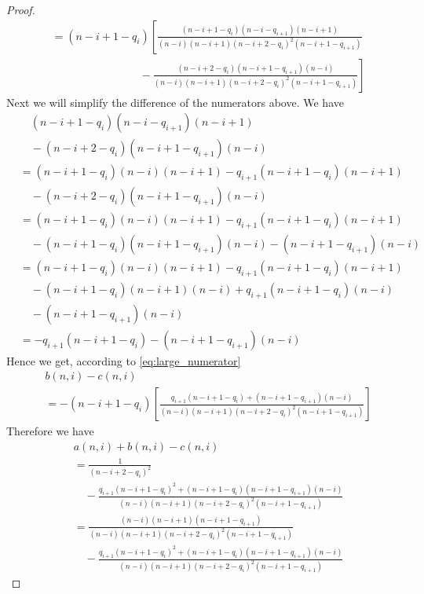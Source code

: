 \begin{lemma}
\begin{proof}
\begin{align}
		&= (n-i+1-q_i)\left[\frac{(n-i+1-q_i)(n-i-q_{i+1})(n-i+1)}{(n-i)(n-i+1)(n-i+2-q_i)^2(n-i+1-q_{i+1})}\right.\nonumber\\
		& \left. \qquad\qquad\qquad\qquad - \frac{(n-i+2-q_i)(n-i+1-q_{i+1})(n-i)}{(n-i)(n-i+1)(n-i+2-q_i)^2(n-i+1-q_{i+1})}\right]
		\label{eq:large_numerator}
		\end{align}
		Next we will simplify the difference of the numerators above. We have 
		\begin{align}
		&\quad (n-i+1-q_i)(n-i-q_{i+1})(n-i+1)\nonumber\\
		&\quad- (n-i+2-q_i)(n-i+1-q_{i+1})(n-i)\nonumber\\
		&= (n-i+1-q_i)(n-i)(n-i+1)- q_{i+1}(n-i+1-q_i)(n-i+1)\nonumber\\
		&\quad- (n-i+2-q_i)(n-i+1-q_{i+1})(n-i)\nonumber\\
		&= (n-i+1-q_i)(n-i)(n-i+1)- q_{i+1}(n-i+1-q_i)(n-i+1)\nonumber\\
		&\quad- (n-i+1-q_i)(n-i+1-q_{i+1})(n-i)- (n-i+1-q_{i+1})(n-i)\nonumber\\
		&= (n-i+1-q_i)(n-i)(n-i+1)- q_{i+1}(n-i+1-q_i)(n-i+1)\nonumber\\
		&\quad- (n-i+1-q_i)(n-i+1)(n-i)+ q_{i+1}(n-i+1-q_i)(n-i)\nonumber\\
		&\quad- (n-i+1-q_{i+1})(n-i)\nonumber\\
		&= - q_{i+1}(n-i+1-q_i) - (n-i+1-q_{i+1})(n-i)\nonumber
		\end{align}
		Hence we get, according to \eqref{eq:large_numerator} 
		\begin{align*}
		& b(n,i) - c(n,i) \nonumber\\
		&= -(n-i+1-q_i)\left[\frac{ q_{i+1}(n-i+1-q_i) + (n-i+1-q_{i+1})(n-i)}{(n-i)(n-i+1)(n-i+2-q_i)^2(n-i+1-q_{i+1})}\right]
		\end{align*}
		Therefore we have 
		\begin{align}
		& a(n,i) + b(n,i) - c(n,i) \nonumber\\
		&= \frac{1}{(n-i+2-q_i)^2}\nonumber\\
		&\quad - \frac{q_{i+1}(n-i+1-q_i)^2 + (n-i+1-q_i)(n-i+1-q_{i+1})(n-i)}{(n-i)(n-i+1)(n-i+2-q_i)^2(n-i+1-q_{i+1})}\nonumber\\
		&= \frac{(n-i)(n-i+1)(n-i+1-q_{i+1})}{(n-i)(n-i+1)(n-i+2-q_i)^2(n-i+1-q_{i+1})}\nonumber\\
		&\quad - \frac{q_{i+1}(n-i+1-q_i)^2 + (n-i+1-q_i)(n-i+1-q_{i+1})(n-i)}{(n-i)(n-i+1)(n-i+2-q_i)^2(n-i+1-q_{i+1})}\nonumber
		\end{align}

\end{proof}
\end{lemma}
